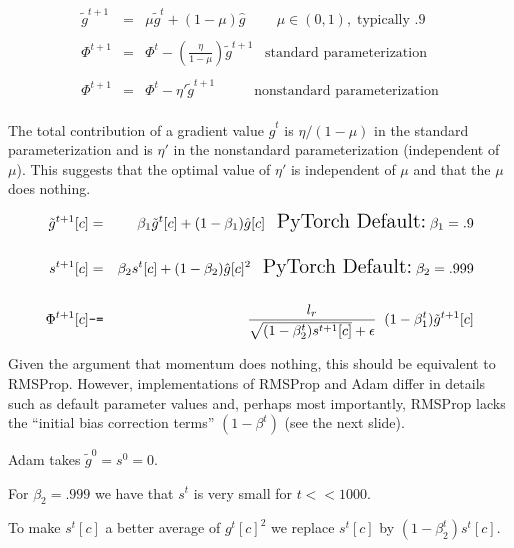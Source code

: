 {

\begin{eqnarray*}
  \tilde{g}^{t+1} & = & \mu \tilde{g}^t + (1-\mu) \hat{g}  \;\;\;\;\;\;\;\;\mu \in (0,1),\;\mbox{typically .9} \\
  \\
  \Phi^{t+1} & = & \Phi^t -  \left(\frac{\eta}{1-\mu}\right)\tilde{g}^{t+1} \;\;\;\mbox{standard parameterization}\\
  \\
  \Phi^{t+1} & = & \Phi^t -  \eta'\tilde{g}^{t+1} \;\;\;\;\;\;\;\;\;\;\mbox{nonstandard parameterization}\\
\end{eqnarray*}

\vfill
The total contribution of a gradient value $\hat{g}^t$ is $\eta/(1-\mu)$ in the standard parameterization
and is $\eta'$ in the nonstandard parameterization (independent of $\mu$).
This suggests that the optimal value of $\eta'$ is independent of $\mu$ and that the $\mu$ does nothing.


\begin{eqnarray*}
  \tilde{g}^{t+1}[c] & = & \beta_1\tilde{g}^t[c] + (1-\beta_1) \hat{g}[c] \;\;\;  {\Large \mbox{PyTorch Default:}\;\beta_1 = .9} \\
  \\
  s^{t+1}[c] & = & \beta_2 s^t[c] + (1-\beta_2) \hat{g}[c]^2 \;\;\;{\Large \mbox{PyTorch Default:}\;\beta_2 = .999}\\
  \\
\Phi^{t+1}[c] & \mbox{\tt -=} & \frac{l_r}{\sqrt{(1-\beta_2^t)s^{t+1}[c]} + \epsilon}\;\; (1-\beta_1^t)\tilde{g}^{t+1}[c]
\end{eqnarray*}

\vfill
Given the argument that momentum does nothing, this should be
equivalent to RMSProp.  However, implementations of RMSProp and Adam differ in details such as default parameter values
and, perhaps most importantly, RMSProp lacks the ``initial bias correction terms'' $(1-\beta^t)$ (see the next slide).


Adam takes $\tilde{g}^0 = s^0 = 0$.

\vfill
For $\beta_2 = .999$ we have that $s^t$ is very small for $t << 1000$.

\vfill
To make $s^t[c]$ a better average of $g^t[c]^2$ we replace $s^t[c]$ by $(1-\beta_2^t)s^t[c]$.

}
